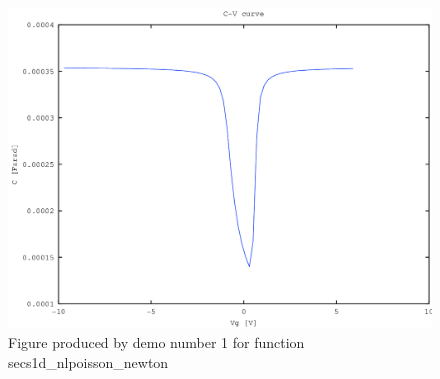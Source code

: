 \begin{figure}\centering
\includegraphics[width=.7\linewidth]{function/images/secs1d_nlpoisson_newton_85.png}
\caption{Figure produced by demo number 1 for function secs1d\_nlpoisson\_newton}
\label{fig:secs1d_nlpoisson_newton_figure_1}
\end{figure}
\clearpage
